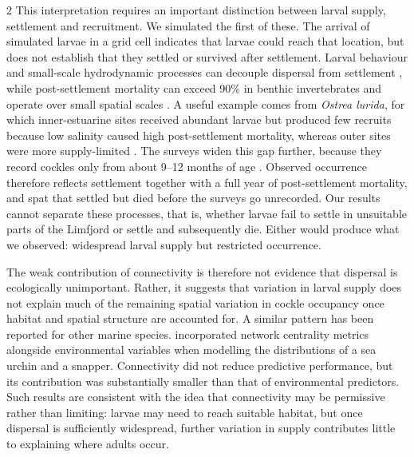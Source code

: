 \begin{spacing}{2}
This interpretation requires an important distinction between larval supply, settlement and recruitment. We simulated the first of these. The arrival of simulated larvae in a grid cell indicates that larvae could reach that location, but does not establish that they settled or survived after settlement. Larval behaviour and small-scale hydrodynamic processes can decouple dispersal from settlement \citep{pinedaCausesDecouplingLarval2010}, while post-settlement mortality can exceed 90\% in benthic invertebrates and operate over small spatial scales \citep{gosselinJuvenileMortalityBenthic1997, huntRoleEarlyPostsettlement1997}. A useful example comes from \textit{Ostrea lurida}, for which inner-estuarine sites received abundant larvae but produced few recruits because low salinity caused high post-settlement mortality, whereas outer sites were more supply-limited \citep{pritchardVariationLarvalSupply2016}. The surveys widen this gap further, because they record cockles only from about 9--12 months of age \citep{freitasSustainableCockleFishery2023}. Observed occurrence therefore reflects settlement together with a full year of post-settlement mortality, and spat that settled but died before the surveys go unrecorded. Our results cannot separate these processes, that is, whether larvae fail to settle in unsuitable parts of the Limfjord or settle and subsequently die. Either would produce what we observed: widespread larval supply but restricted occurrence.

The weak contribution of connectivity is therefore not evidence that dispersal is ecologically unimportant. Rather, it suggests that variation in larval supply does not explain much of the remaining spatial variation in cockle occupancy once habitat and spatial structure are accounted for. A similar pattern has been reported for other marine species. \citet{cecinoTestingInfluenceSeascape2021} incorporated network centrality metrics alongside environmental variables when modelling the distributions of a sea urchin and a snapper. Connectivity did not reduce predictive performance, but its contribution was substantially smaller than that of environmental predictors. Such results are consistent with the idea that connectivity may be permissive rather than limiting: larvae may need to reach suitable habitat, but once dispersal is sufficiently widespread, further variation in supply contributes little to explaining where adults occur.


\end{spacing}
